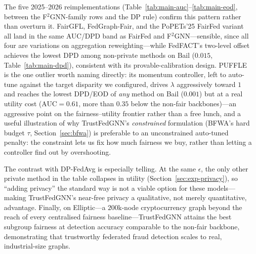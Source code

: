 \documentclass[pdflatex,sn-mathphys-num]{sn-jnl}
\theoremstyle{thmstyleone}%
\theoremstyle{thmstyletwo}%
\theoremstyle{thmstylethree}%
\begin{document}
The five 2025--2026 reimplementations (Table~\ref{tab:main-auc}--\ref{tab:main-eod},
between the F$^2$GNN-family rows and the DP rule) confirm this pattern rather
than overturn it. FairGFL, FedGraph-Fair, and the PoPETs'25 FairFed variant
all land in the same AUC/DPD band as FairFed and F$^2$GNN---sensible, since
all four are variations on aggregation reweighting---while FedFACT's two-level
offset achieves the lowest DPD among non-private methods on Bail ($0.015$,
Table~\ref{tab:main-dpd}), consistent with its provable-calibration design.
PUFFLE is the one outlier worth naming directly: its momentum controller, left
to auto-tune against the target disparity we configured, drives $\lambda$
aggressively toward $1$ and reaches the lowest DPD/EOD of \emph{any} method on
Bail ($0.001$) but at a real utility cost ($\mathrm{AUC}{=}0.61$, more than
$0.35$ below the non-fair backbones)---an aggressive point on the
fairness--utility frontier rather than a free lunch, and a useful illustration
of why TrustFedGNN's \emph{constrained} formulation (BFWA's hard budget $\tau$,
Section~\ref{sec:bfwa}) is preferable to an unconstrained auto-tuned penalty:
the constraint lets us fix how much fairness we buy, rather than letting a
controller find out by overshooting.

The contrast with DP-FedAvg is especially telling. At the same
$\epsilon$, the only other private method in the table collapses in utility
(Section~\ref{sec:exp-privacy}), so ``adding privacy'' the standard way is not a
viable option for these models---making TrustFedGNN's near-free privacy a
qualitative, not merely quantitative, advantage. Finally, on Elliptic---a
$200$k-node cryptocurrency graph beyond the reach of every centralised fairness
baseline---TrustFedGNN attains the best subgroup fairness at detection accuracy
comparable to the non-fair backbone, demonstrating that trustworthy federated
fraud detection scales to real, industrial-size graphs.

\begin{table}[t]\centering\small
\caption{Utility (AUC-ROC, higher is better). Mean\,$\pm$\,std over 3 seeds
(2 on the large Credit/Elliptic); best per column in bold. TrustFedGNN is the
only method that is fair \emph{and} private (methods above the rule are
non-private). $^{\ast}$FaVGNN is a horizontal adaptation of a vertical-FL
method. FairGFL/FedGraph-Fair/PUFFLE/FedFACT/PoPETs'25 are 2025--2026
reimplementations with approximated fidelity (Appendix~\ref{app:baselines}).}
\label{tab:main-auc}

\end{table}
\end{document}
